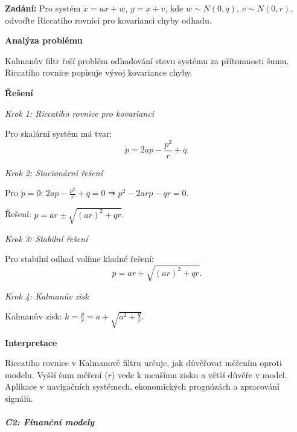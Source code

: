 \begin{example}
\label{ex:c1-stredni-kalman}

\noindent\textbf{Zadání:} Pro systém $\dot{x} = ax + w$, $y = x + v$, kde $w \sim N(0,q)$, $v \sim N(0,r)$, odvoďte Riccatiho rovnici pro kovarianci chyby odhadu.

\vspace{1.5\baselineskip}

\noindent\textbf{Analýza problému}

\noindent Kalmanův filtr řeší problém odhadování stavu systému za přítomnosti šumu. Riccatiho rovnice popisuje vývoj kovariance chyby.

\vspace{1.5\baselineskip}

\noindent\textbf{Řešení}

\noindent\textit{Krok 1: Riccatiho rovnice pro kovarianci}

Pro skalární systém má tvar:
\[
\dot{p} = 2ap - \frac{p^2}{r} + q.
\]

\noindent\textit{Krok 2: Stacionární řešení}

Pro $\dot{p} = 0$: $2ap - \frac{p^2}{r} + q = 0$ ⇒ $p^2 - 2ar p - qr = 0$.

Řešení: $p = ar \pm \sqrt{(ar)^2 + qr}$.

\noindent\textit{Krok 3: Stabilní řešení}

Pro stabilní odhad volíme kladné řešení:
\[
p = ar + \sqrt{(ar)^2 + qr}.
\]

\noindent\textit{Krok 4: Kalmanův zisk}

Kalmanův zisk: $k = \frac{p}{r} = a + \sqrt{a^2 + \frac{q}{r}}$.

\vspace{1.5\baselineskip}

\noindent\textbf{Interpretace}

Riccatiho rovnice v Kalmanově filtru určuje, jak důvěřovat měřením oproti modelu. 
Vyšší šum měření ($r$) vede k menšímu zisku a větší důvěře v model. Aplikace 
v navigačních systémech, ekonomických prognózách a zpracování signálů.

\end{example}

\vspace{2\baselineskip}

\subparagraph*{C2: Finanční modely}
\label{subpar:c2-financni-modely}

